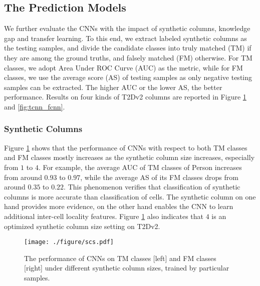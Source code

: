 \documentclass[letterpaper]{article}
\newcommand{\rv}[1]{{\color{black}#1}}
\newcommand{\camera}[1]{{\color{black}#1}}
\begin{document}
\subsection{The Prediction Models}
We further evaluate the \rv{CNNs}
with the impact of synthetic columns, knowledge gap and transfer learning.
To this end,
we extract \rv{labeled synthetic columns as the testing samples, 
and} divide the candidate classes into truly matched (TM) if they are among the ground truths,
and falsely matched (FM) otherwise.
For TM classes, we adopt Area Under ROC Curve (AUC) as the metric,
while for FM classes,
we use the average score (AS) of testing samples as only negative testing samples can be extracted.
The higher AUC or the lower AS, the better performance.
Results on four kinds of T2Dv2 columns are reported in Figure \ref{fig:scs} and \ref{fig:tcnn_fcnn}.



\subsubsection{Synthetic Columns}
Figure \ref{fig:scs} 
\camera{shows}
that
the performance of CNNs \camera{with respect to} both TM classes and FM classes mostly increases as the synthetic column size increases, 
especially from $1$ to $4$.
For example, the average AUC of TM classes of Person increases from around $0.93$ to $0.97$,
while the average AS of its FM classes drops from around $0.35$ to $0.22$.
This phenomenon verifies that \rv{classification of synthetic columns 
is more accurate than classification of cells}.
The synthetic column on one hand provides more evidence,
on the other hand enables the CNN to learn additional inter-cell locality features.
Figure \ref{fig:scs} also 
\camera{indicates}
that
$4$ is an optimized synthetic column size setting on T2Dv2. 


\begin{figure}[!t]
\centering
\texttt{[image: ./figure/scs.pdf]}
\caption{The performance of CNNs \camera{on} TM classes  [left] and FM classes [right] under different synthetic column sizes, \rv{trained by particular samples}.}
\label{fig:scs}
\end{figure}
\end{document}
